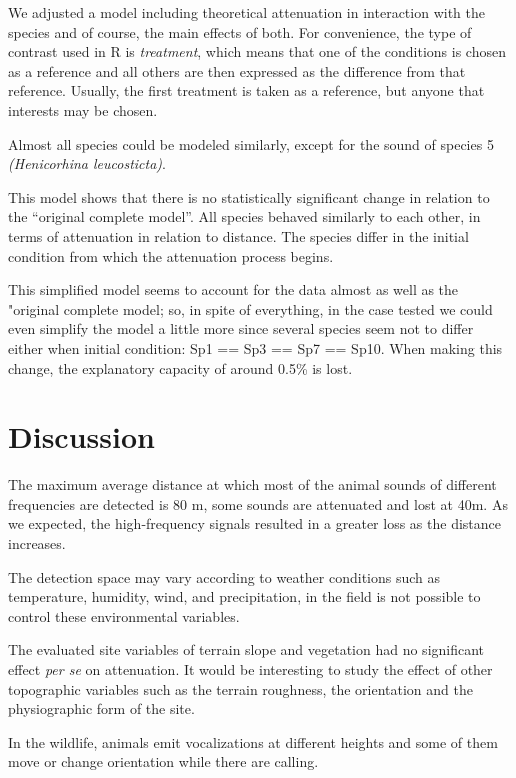 \documentclass[fleqn,10pt,lineno]{wlpeerj} %
\begin{document}
We adjusted a model including theoretical attenuation in interaction
with the species and of course, the main effects of both. For
convenience, the type of contrast used in R is \emph{treatment}, which
means that one of the conditions is chosen as a reference and all others
are then expressed as the difference from that reference. Usually, the
first treatment is taken as a reference, but anyone that interests may
be chosen.

Almost all species could be modeled similarly, except for the sound of
species 5 \emph{(Henicorhina leucosticta)}.

This model shows that there is no statistically significant change in
relation to the ``original complete model''. All species behaved
similarly to each other, in terms of attenuation in relation to
distance. The species differ in the initial condition from which the
attenuation process begins.

This simplified model seems to account for the data almost as well as
the "original complete model; so, in spite of everything, in the case
tested we could even simplify the model a little more since several
species seem not to differ either when initial condition: Sp1 == Sp3 ==
Sp7 == Sp10. When making this change, the explanatory capacity of around
0.5\% is lost.

\hypertarget{discussion}{%
\section*{Discussion}\label{discussion}}

The maximum average distance at which most of the animal sounds of
different frequencies are detected is 80 m, some sounds are attenuated
and lost at 40m. As we expected, the high-frequency signals resulted in
a greater loss as the distance increases.

The detection space may vary according to weather conditions such as
temperature, humidity, wind, and precipitation, in the field is not
possible to control these environmental variables.

The evaluated site variables of terrain slope and vegetation had no
significant effect \emph{per se} on attenuation. It would be interesting
to study the effect of other topographic variables such as the terrain
roughness, the orientation and the physiographic form of the site.

In the wildlife, animals emit vocalizations at different heights and
some of them move or change orientation while there are calling.
\end{document}

